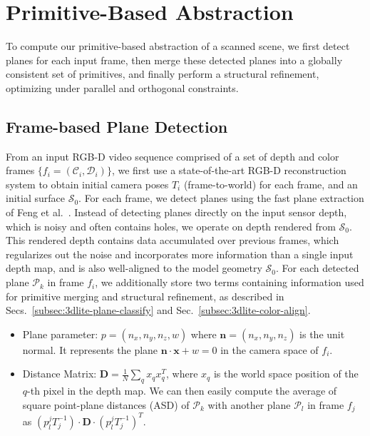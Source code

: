 \section{Primitive-Based Abstraction}
\label{sec:3dlite-plane-abstraction}

To compute our primitive-based abstraction of a scanned scene, we first detect planes for each input frame, then merge these detected planes into a globally consistent set of primitives, and finally perform a structural refinement, optimizing under parallel and orthogonal constraints.

\subsection{Frame-based Plane Detection}
\label{subsec:3dlite-plane-detect}

From an input RGB-D video sequence comprised of a set of depth and color frames $\{f_i = (\mathcal{C}_i, \mathcal{D}_i)\}$, we first use a state-of-the-art RGB-D reconstruction system to obtain initial camera poses $T_i$ (frame-to-world) for each frame, and an initial surface $\mathcal{S}_0$.
For each frame, we detect planes using the fast plane extraction of Feng et al.~\cite{feng2014fast}. 
Instead of detecting planes directly on the input sensor depth, which is noisy and often contains holes, we operate on depth rendered from $\mathcal{S}_0$.
This rendered depth contains data accumulated over previous frames, which regularizes out the noise and incorporates more information than a single input depth map, and is also well-aligned to the model geometry $\mathcal{S}_0$.
For each detected plane $\mathcal{P}_k$ in frame $f_i$, we additionally store two terms containing information used for primitive merging and structural refinement, as described in Secs.~\ref{subsec:3dlite-plane-classify} and Sec.~\ref{subsec:3dlite-color-align}.
\begin{itemize}
    \item Plane parameter: $p=(n_x,n_y,n_z,w)$ where $\mathbf{n} = (n_x,n_y,n_z)$ is the unit normal. It represents the plane $\mathbf{n}\cdot \mathbf{x} + w=0$ in the camera space of $f_i$. 
    \item Distance Matrix: $\mathbf{D} = \frac{1}{N}\sum_{q} x_qx_q^T$, where $x_q$ is the world space position of the $q$-th pixel in the depth map. 
    We can then easily compute the average of square point-plane distances (ASD) of $\mathcal{P}_k$ with another plane $\mathcal{P}_l$ in frame $f_j$ as $(p_l^jT_j^{-1})\cdot \mathbf{D}\cdot (p_l^jT_j^{-1})^T$. 
\end{itemize}

